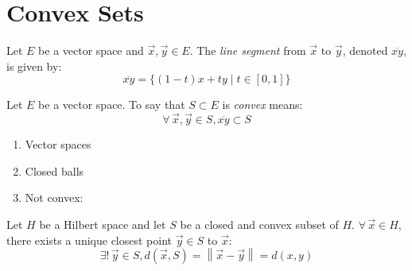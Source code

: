 \documentclass[letterpaper,12pt,fleqn]{article}
\newcommand{\vx}{\vec{x}}
\newcommand{\vy}{\vec{y}}
\newcommand{\seg}[1]{\overline{#1}}
\newcommand{\norm}[1]{\left\|#1\right\|}
\begin{document}
\section*{Convex Sets}

\begin{definition}
  Let $E$ be a vector space and $\vx,\vy\in E$. The \emph{line segment} from
  $\vx$ to $\vy$, denoted $\seg{xy}$, is given by:
  \[\seg{xy}=\{(1-t)x+ty\mid t\in[0,1]\}\]
\end{definition}

\begin{definition}[Convex]
  Let $E$ be a vector space. To say that $S\subset E$ is \emph{convex} means:
  \[\forall\,\vx,\vy\in S,\seg{xy}\subset S\]
\end{definition}

\begin{examples}
  \listbreak
  \begin{enumerate}
  \item Vector spaces
  \item Closed balls
  \item Not convex:

  \end{enumerate}
\end{examples}

\begin{theorem}
  Let $H$ be a Hilbert space and let $S$ be a closed and convex subset of $H$.
  $\forall\,\vx\in H$, there exists a unique closest point $\vy\in S$ to $\vx$:
  \[\exists!\,\vy\in S,d(\vx,S)=\norm{\vx-\vy}=d(x,y)\]
\end{theorem}
\end{document}
